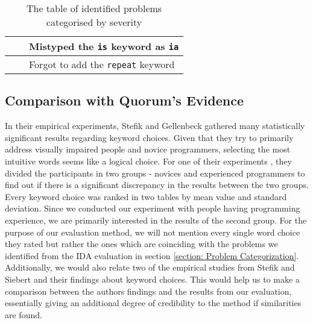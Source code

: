 \documentclass[preprint,10pt]{sigplanconf}
\begin{document}
\begin{table*}[]
\begin{minipage}[c]{\textwidth}
\begin{center}
\begin{tabular}{| p{5cm} | p{5cm} | p{5cm} |}
                                                           &                                                                    & Mistyped the \lstinline!is! keyword as \lstinline!ia!					                                   \\ \hline
                                                           &                                                                    & Forgot to add the \lstinline!repeat! keyword		                                                       \\ \hline
\end{tabular}
\end{center}
\caption{The table of identified problems categorised by severity}
\label{QuorumProblemResult}
\end{minipage}
\end{table*}

\subsection{Comparison with Quorum's Evidence}
In their empirical experiments, Stefik and Gellenbeck \cite{EmpStudiesonStimuli} gathered many statistically significant results regarding keyword choices. Given that they try to primarily address visually impaired people and novice programmers, selecting the most intuitive words seems like a logical choice. For one of their  experiments \cite{EmpStudiesonStimuli}, they divided the participants in two groups - novices and experienced programmers to find out if there is a significant discrepancy in the results between the two groups. Every keyword choice was ranked in two tables by mean value and standard deviation. Since we conducted our experiment with people having programming experience, we are primarily interested in the results of the second group. For the purpose of our evaluation method, we will not mention every single word choice they rated but rather the ones which are coinciding with the problems we identified from the IDA evaluation in section \ref{section: Problem Categorization}. Additionally, we would also relate two of the empirical studies from Stefik and Siebert \cite{Empiricalinvestigation} and their findings about keyword choices. This would help us to make a comparison between the authors findings and the results from our evaluation, essentially giving an additional degree of credibility to the method if similarities are found.
\end{document}
